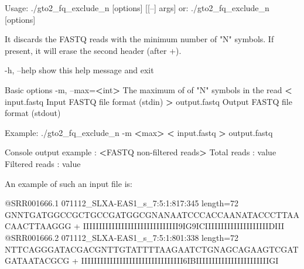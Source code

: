 \documentclass[11pt,]{krantz}
\newenvironment{Shaded}{\begin{snugshade}}{\end{snugshade}}
\newcommand{\StringTok}[1]{\textcolor[rgb]{0.5,0.5,0.5}{#1}}
\newcommand{\OperatorTok}[1]{\textcolor[rgb]{0.43,0.43,0.43}{\textbf{#1}}}
\newcommand{\ExtensionTok}[1]{#1}
\newcommand{\NormalTok}[1]{#1}
\begin{document}
\begin{Shaded}
\begin{Highlighting}[]
\ExtensionTok{Usage}\NormalTok{: ./gto2_fq_exclude_n [options] [[--] args]}
   \ExtensionTok{or}\NormalTok{: ./gto2_fq_exclude_n [options]}

\ExtensionTok{It}\NormalTok{ discards the FASTQ reads with the minimum number of }\StringTok{"N"} 
\ExtensionTok{symbols.} 
\ExtensionTok{If}\NormalTok{ present, it will erase the second header (after +)}\ExtensionTok{.}

    \ExtensionTok{-h}\NormalTok{, --help            show this help message and exit}

\ExtensionTok{Basic}\NormalTok{ options}
    \ExtensionTok{-m}\NormalTok{, --max=}\OperatorTok{<}\NormalTok{int}\OperatorTok{>}\NormalTok{       The maximum of of }\StringTok{"N"}\NormalTok{ symbols in }
                          \ExtensionTok{the}\NormalTok{ read}
    \OperatorTok{<} \ExtensionTok{input.fastq}\NormalTok{         Input FASTQ file format (stdin)}
    \OperatorTok{>} \ExtensionTok{output.fastq}\NormalTok{        Output FASTQ file format (stdout)}

\ExtensionTok{Example}\NormalTok{: ./gto2_fq_exclude_n -m }\OperatorTok{<}\NormalTok{max}\OperatorTok{>} \OperatorTok{<}\NormalTok{ input.fastq }\OperatorTok{>} 
\ExtensionTok{output.fastq}

\ExtensionTok{Console}\NormalTok{ output example :}
\OperatorTok{<}\ExtensionTok{FASTQ}\NormalTok{ non-filtered reads}\OperatorTok{>}
\ExtensionTok{Total}\NormalTok{ reads    : value}
\ExtensionTok{Filtered}\NormalTok{ reads : value}
\end{Highlighting}
\end{Shaded}

An example of such an input file is:

\begin{Shaded}
\begin{Highlighting}[]
\ExtensionTok{@SRR001666.1}\NormalTok{ 071112_SLXA-EAS1_s_7:5:1:817:345 length=72}
\ExtensionTok{GNNTGATGGCCGCTGCCGATGGCGNANAATCCCACCAANATACCCTTAACAACTTAAGGG}
\ExtensionTok{+}
\ExtensionTok{IIIIIIIIIIIIIIIIIIIIIIIIIIIIII9IG9ICIIIIIIIIIIIIIIIIIIIIDIII}
\ExtensionTok{@SRR001666.2}\NormalTok{ 071112_SLXA-EAS1_s_7:5:1:801:338 length=72}
\ExtensionTok{NTTCAGGGATACGACGNTTGTATTTTAAGAATCTGNAGCAGAAGTCGATGATAATACGCG}
\ExtensionTok{+}
\ExtensionTok{IIIIIIIIIIIIIIIIIIIIIIIIIIIIIIII6IBIIIIIIIIIIIIIIIIIIIIIIIGI}
\end{Highlighting}
\end{Shaded}
\end{document}

